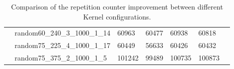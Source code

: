 \begin{table}[!htbp]
{\begin{tabular}{@{}lllllll@{}}
            & random60\_240\_3\_1000\_1\_14  &60963  &60477  &60938 &60818\\  
            & random75\_225\_4\_1000\_1\_17 &60449  &56633  &60426  &60432 \\  
            & random75\_375\_2\_1000\_1\_5 &101242  &99489  &100735  &100873   \\ 
            \bottomrule
        \end{tabular}
        }
    \caption{Comparison of the repetition counter improvement between different Kernel configurations.}
    \label{tab:comp_rep}
\end{table}
